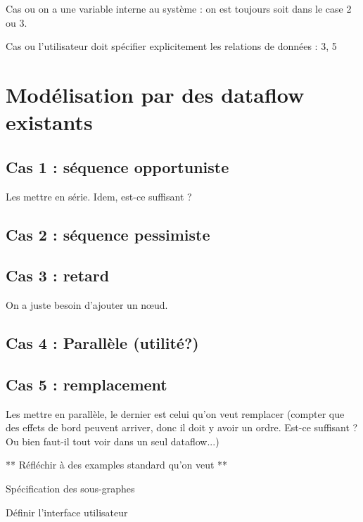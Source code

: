 \documentclass[french,a4paper]{article}
\begin{document}
Cas ou on a une variable interne au système : on est toujours soit dans le case 2 ou 3.

Cas ou l'utilisateur doit spécifier explicitement les relations de données : 3, 5

\section{Modélisation par des dataflow existants}

\subsection{Cas 1 : séquence opportuniste}
Les mettre en série. Idem, est-ce suffisant ? 

\subsection{Cas 2 : séquence pessimiste}

\subsection{Cas 3 : retard}
On a juste besoin d'ajouter un nœud.


\subsection{Cas 4 : Parallèle (utilité?)}

\subsection{Cas 5 : remplacement}
Les mettre en parallèle, le dernier est celui qu'on veut remplacer (compter que des effets de bord peuvent arriver, donc il doit y avoir un ordre. Est-ce suffisant ? Ou bien faut-il tout voir dans un seul dataflow...)



** Réfléchir à des examples standard qu'on veut **


Spécification des sous-graphes

Définir l'interface utilisateur
\end{document}
